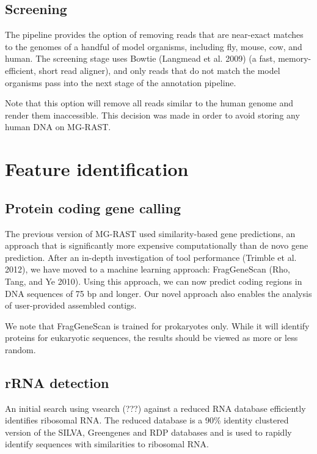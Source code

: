\documentclass[letterpaper,10pt,english]{sphinxmanual}
\begin{document}
\subsection{Screening}
\label{\detokenize{user_manual:screening}}
The pipeline provides the option of removing reads that are near-exact
matches to the genomes of a handful of model organisms, including fly,
mouse, cow, and human. The screening stage uses Bowtie (Langmead et al.
2009) (a fast, memory-efficient, short read aligner), and only reads
that do not match the model organisms pass into the next stage of the
annotation pipeline.

Note that this option will remove all reads similar to the human genome
and render them inaccessible. This decision was made in order to avoid
storing any human DNA on MG-RAST.


\section{Feature identification}
\label{\detokenize{user_manual:feature-identification}}

\subsection{Protein coding gene calling}
\label{\detokenize{user_manual:protein-coding-gene-calling}}
The previous version of MG-RAST used similarity-based gene predictions,
an approach that is significantly more expensive computationally than de
novo gene prediction. After an in-depth investigation of tool
performance (Trimble et al. 2012), we have moved to a machine learning
approach: FragGeneScan (Rho, Tang, and Ye 2010). Using this approach, we
can now predict coding regions in DNA sequences of 75 bp and longer. Our
novel approach also enables the analysis of user-provided assembled
contigs.

We note that FragGeneScan is trained for prokaryotes only. While it will
identify proteins for eukaryotic sequences, the results should be viewed
as more or less random.


\subsection{rRNA detection}
\label{\detokenize{user_manual:rrna-detection}}
An initial search using vsearch (???) against a reduced RNA database
efficiently identifies ribosomal RNA. The reduced database is a 90\%
identity clustered version of the SILVA, Greengenes and RDP databases
and is used to rapidly identify sequences with similarities to ribosomal
RNA.
\end{document}
